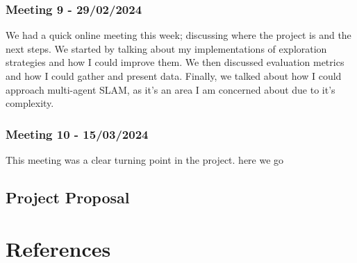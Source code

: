 \documentclass[12pt]{article}
\begin{document}
\subsubsection{Meeting 9 - 29/02/2024}
We had a quick online meeting this week; discussing where the project is and the next steps. We started by talking about
my implementations of exploration strategies and how I could improve them. We then discussed evaluation metrics and how I
could gather and present data. Finally, we talked about how I could approach multi-agent SLAM, as it's an area I am concerned
about due to it's complexity.
\subsubsection{Meeting 10 - 15/03/2024}
This meeting was a clear turning point in the project. here we go

\subsection{Project Proposal}


\section{References}
\end{document}
